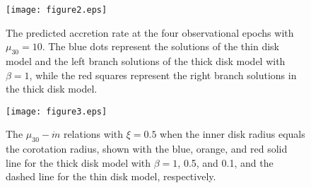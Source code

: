 \documentclass[12pt,preprint]{aastex}
\begin{document}
\clearpage

\begin{figure}
\centerline{\texttt{[image: figure2.eps]}}
\caption{The predicted accretion rate at the four observational epochs with $\mu_{30}=10$. The blue dots represent the solutions of the thin disk model and the left branch solutions of the thick disk model with $\beta=1$, while the red squares represent the right branch solutions in the thick disk model.
}
\end{figure}


\newpage

\begin{figure}
\centerline{\texttt{[image: figure3.eps]}}

\caption{The $\mu_{30}-\dot{m}$ relations with $\xi=0.5$ when the inner disk radius equals the corotation radius, shown with the blue, orange, and red solid line for the thick disk model with $\beta=1$, 0.5, and 0.1, and the dashed line for the thin disk model, respectively.}
\end{figure}

\label{lastpage}
\end{document}

